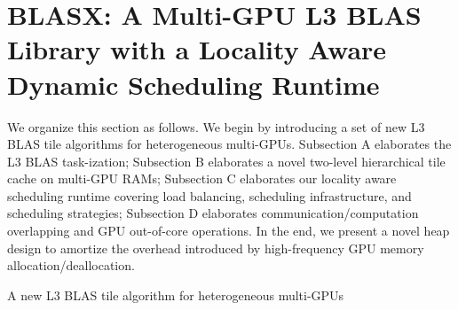 \documentclass[conference]{IEEEtran}
\begin{document}
\section{BLASX: A Multi-GPU L3 BLAS Library with a Locality Aware Dynamic Scheduling Runtime}

We organize this section as follows. We begin by introducing a set of new L3 BLAS tile 
algorithms for heterogeneous multi-GPUs. Subsection A elaborates the L3 BLAS task-ization;
Subsection B elaborates a novel two-level hierarchical tile cache on multi-GPU RAMs; 
Subsection C elaborates our locality aware scheduling runtime covering load balancing,
scheduling infrastructure, and scheduling strategies; 
Subsection D elaborates communication/computation overlapping and GPU out-of-core operations. 
In the end, we present a novel heap design to amortize the overhead introduced by 
high-frequency GPU memory allocation/deallocation.

\vspace{-0.1in}
\begin{algorithm}
\caption{A new L3 BLAS tile algorithm for heterogeneous multi-GPUs}
\label{BLASX_alg}
\DontPrintSemicolon
{}
\hfill \\
\end{algorithm}
\vspace{-0.15in}
\end{document}

